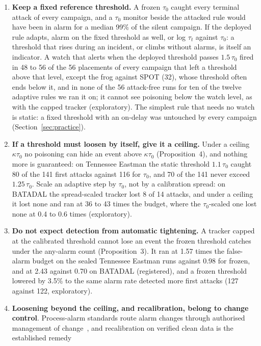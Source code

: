 \documentclass[letterpaper,twocolumn,10pt]{article}
\begin{document}
\begin{enumerate}
\item \textbf{Keep a fixed reference threshold.} A frozen $\tau_0$ caught every terminal attack of
  every campaign, and a $\tau_0$ monitor beside the attacked rule would have been in alarm for a median
  99\% of the silent campaign. If the deployed rule adapts, alarm on the fixed threshold as well, or log
  $\tau_t$ against $\tau_0$: a threshold that rises during an incident, or climbs without alarms, is
  itself an indicator. A watch that alerts when the deployed threshold passes $1.5\,\tau_0$ fired in 48
  to 56 of the 56 placements of every campaign that left a threshold above that level, except the frog
  against SPOT (32), whose threshold often ends below it, and in none of the 56 attack-free runs
  for ten of the twelve adaptive rules we ran it on; it cannot see poisoning below the watch level,
  as with the capped tracker (exploratory). The simplest rule that needs no watch is static: a fixed
  threshold with an on-delay was untouched by every campaign (Section~\ref{sec:practice}).
\item \textbf{If a threshold must loosen by itself, give it a ceiling.} Under a ceiling
  $\kappa\tau_0$ no poisoning can hide an event above $\kappa\tau_0$ (Proposition~4), and nothing more
  is guaranteed: on Tennessee Eastman the static threshold $1.1\,\tau_0$ caught 80 of the 141 first
  attacks against 116 for $\tau_0$, and 70 of the 141 never exceed $1.25\,\tau_0$. Scale an adaptive
  step by $\tau_0$, not by a calibration spread: on BATADAL the spread-scaled tracker lost 8 of 14
  attacks, and under a ceiling it lost none and ran at 36 to 43 times the budget, where the
  $\tau_0$-scaled one lost none at 0.4 to 0.6 times (exploratory).
\item \textbf{Do not expect detection from automatic tightening.} A tracker capped at the calibrated
  threshold cannot lose an event the frozen threshold catches under the any-alarm count
  (Proposition~3). It ran at 1.57 times the false-alarm budget on the sealed Tennessee Eastman runs
  against 0.98 for frozen, and at 2.43 against 0.70 on BATADAL (registered), and a frozen threshold
  lowered by 3.5\% to the same alarm rate detected more first attacks (127 against 122, exploratory).
\item \textbf{Loosening beyond the ceiling, and recalibration, belong to change control}. Process-alarm standards route alarm changes through authorised management of
  change~\cite{isa182, eemua191}, and recalibration on verified clean data is the established remedy

\end{enumerate}
\end{document}
